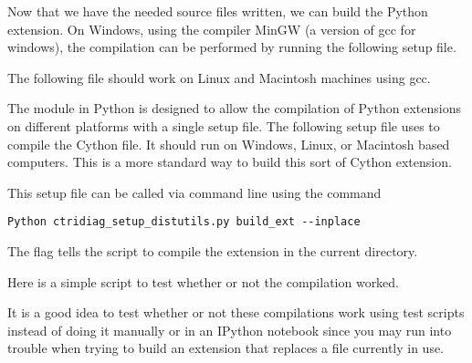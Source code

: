 

Now that we have the needed source files written, we can build the Python extension.
On Windows, using the compiler MinGW (a version of gcc for windows), the compilation can be performed by running the following setup file.



The following file should work on Linux and Macintosh machines using gcc.



The  module in Python is designed to allow the compilation of Python extensions on different platforms with a single setup file.
The following setup file uses  to compile the Cython file.
It should run on Windows, Linux, or Macintosh based computers.
This is a more standard way to build this sort of Cython extension.



This setup file can be called via command line using the command
\begin{lstlisting}[style=ShellInput]
Python ctridiag_setup_distutils.py build_ext --inplace
\end{lstlisting}
The  flag tells the script to compile the extension in the current directory.

Here is a simple script to test whether or not the compilation worked.



\begin{info}
It is a good idea to test whether or not these compilations work using test scripts instead of doing it manually or in an IPython notebook since you may run into trouble when trying to build an extension that replaces a file currently in use.
\end{info}



